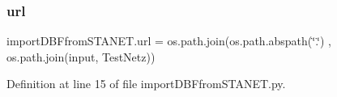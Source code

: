 \subsubsection{\texorpdfstring{url}{url}}
{\footnotesize\ttfamily import\+D\+B\+Ffrom\+S\+T\+A\+N\+E\+T.\+url = os.\+path.\+join(os.\+path.\+abspath(\char`\"{}.\char`\"{}) , os.\+path.\+join(\textquotesingle{}input\textquotesingle{}, \textquotesingle{}Test\+Netz\textquotesingle{}))}



Definition at line 15 of file import\+D\+B\+Ffrom\+S\+T\+A\+N\+E\+T.\+py.

